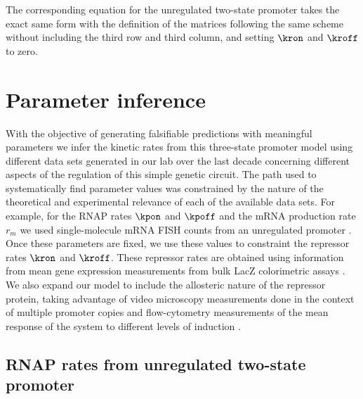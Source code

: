 The corresponding equation for the unregulated two-state promoter takes the
exact same form with the definition of the matrices following the same scheme
without including the third row and third column, and setting $\kron$ and
$\kroff$ to zero.

\section{Parameter inference}

With the objective of generating falsifiable predictions with meaningful
parameters we infer the kinetic rates from this three-state promoter model using
different data sets generated in our lab over the last decade concerning
different aspects of the regulation of this simple genetic circuit. The path
used to systematically find parameter values was constrained by the nature of
the theoretical and experimental relevance of each of the available data sets.
For example, for the RNAP rates $\kpon$ and $\kpoff$ and the mRNA production
rate $r_m$ we used single-molecule mRNA FISH counts from an unregulated promoter
\cite{Jones2014a}. Once these parameters are fixed, we use these values to
constraint the repressor rates $\kron$ and $\kroff$. These repressor rates are
obtained using information from mean gene expression measurements from bulk LacZ
colorimetric assays \cite{Garcia2011c}. We also expand our model to include the
allosteric nature of the repressor protein, taking advantage of video microscopy
measurements done in the context of multiple promoter copies \cite{Brewster2014}
and flow-cytometry measurements of the mean response of the system to different
levels of induction \cite{Razo-Mejia2018}.

\subsection{RNAP rates from unregulated two-state promoter}

